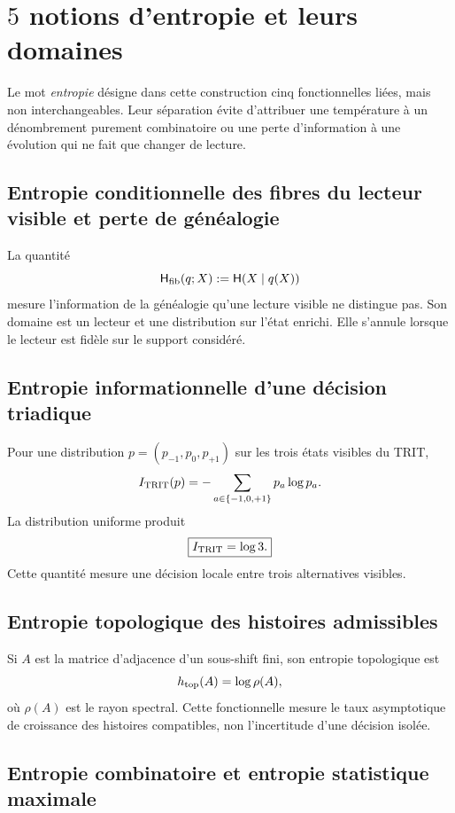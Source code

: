 \section{\(5\) notions d'entropie et leurs domaines}

Le mot \emph{entropie} désigne dans cette construction cinq fonctionnelles
liées, mais non interchangeables. Leur séparation évite d'attribuer une température
à un dénombrement purement combinatoire ou une perte d'information à une évolution
qui ne fait que changer de lecture.

\subsection{Entropie conditionnelle des fibres du lecteur visible et perte de généalogie}

La quantité
\[
 \mathsf H_{\rm fib}(q;X):=\mathsf H(X\mid q(X))
\]
mesure l'information de la généalogie qu'une lecture visible ne distingue pas.
Son domaine est un lecteur et une distribution sur l'état enrichi. Elle
s'annule lorsque le lecteur est fidèle sur le support considéré.

\subsection{Entropie informationnelle d'une décision triadique}

Pour une distribution \(p=(p_{-1},p_0,p_{+1})\) sur les trois états
visibles du TRIT,
\[
 I_{\rm TRIT}(p)=-\sum_{a\in\{-1,0,+1\}}p_a\log p_a.
\]
La distribution uniforme produit
\begin{equation}
 \boxed{I_{\rm TRIT}=\log3.}
 \label{eq:informacion-trit-log3-anexo}
\end{equation}
Cette quantité mesure une décision locale entre trois alternatives visibles.

\subsection{Entropie topologique des histoires admissibles}

Si \(A\) est la matrice d'adjacence d'un sous-shift fini, son entropie
topologique est
\[
 h_{\rm top}(A)=\log\rho(A),
\]
où \(\rho(A)\) est le rayon spectral. Cette fonctionnelle mesure le taux
asymptotique de croissance des histoires compatibles, non l'incertitude
d'une décision isolée.

\subsection{Entropie combinatoire et entropie statistique maximale}

